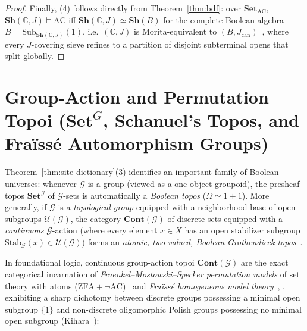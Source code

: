 \documentclass[10pt,twoside,openright]{book}
\theoremstyle{crmplain}
\theoremstyle{crmdef}
\theoremstyle{crmremark}
\begin{document}
\begin{proof}
Finally, (4) follows directly from Theorem~\ref{thm:bdf}: over $\mathbf{Set}_{\mathrm{AC}}$, $\mathbf{Sh}(\mathbb{C}, J) \models \mathrm{AC}$ iff $\mathbf{Sh}(\mathbb{C}, J) \simeq \mathbf{Sh}(B)$ for the complete Boolean algebra $B = \mathrm{Sub}_{\mathbf{Sh}(\mathbb{C}, J)}(1)$, i.e.\ $(\mathbb{C}, J)$ is Morita-equivalent to $(B, J_{\mathrm{can}})$~\cite{Caramello18}, where every $J$-covering sieve refines to a partition of disjoint subterminal opens that split globally.
\end{proof}

\section{\texorpdfstring{Group-Action and Permutation Topoi ($\mathbf{Set}^G$, Schanuel's Topos, and Fraïssé Automorphism Groups)}{Group-Action and Permutation Topoi (SetG, Schanuel's Topos, and Fraïssé Automorphism Groups)}}\label{sec:permutation-topoi}

Theorem~\ref{thm:site-dictionary}(3) identifies an important family of Boolean universes: whenever $\mathcal{G}$ is a group (viewed as a one-object groupoid), the presheaf topos $\mathbf{Set}^{\mathcal{G}}$ of $\mathcal{G}$-sets is automatically a \emph{Boolean topos} ($\Omega \simeq 1+1$). More generally, if $\mathcal{G}$ is a \emph{topological group} equipped with a neighborhood base of open subgroups $\mathcal{U}(\mathcal{G})$, the category $\mathbf{Cont}(\mathcal{G})$ of discrete sets equipped with a \emph{continuous} $\mathcal{G}$-action (where every element $x \in X$ has an open stabilizer subgroup $\mathrm{Stab}_{\mathcal{G}}(x) \in \mathcal{U}(\mathcal{G})$) forms an \emph{atomic, two-valued, Boolean Grothendieck topos}~\cite[Ch.~III, \S 9]{MacLaneMoerdijk92}.

In foundational logic, continuous group-action topoi $\mathbf{Cont}(\mathcal{G})$ are the exact categorical incarnation of \emph{Fraenkel--Mostowski--Specker permutation models} of set theory with atoms ($\mathrm{ZFA} + \neg\mathrm{AC}$)~\cite[Ch.~4]{Jech73} and \emph{Fraïssé homogeneous model theory}~\cite{Fraisse54}, \cite[\S 7.1]{Hodges93}, exhibiting a sharp dichotomy between discrete groups possessing a minimal open subgroup $\{1\}$ and non-discrete oligomorphic Polish groups possessing no minimal open subgroup (Kihara~\cite[Theorems~6.2 and~6.19]{Kihara26}):
\end{document}

